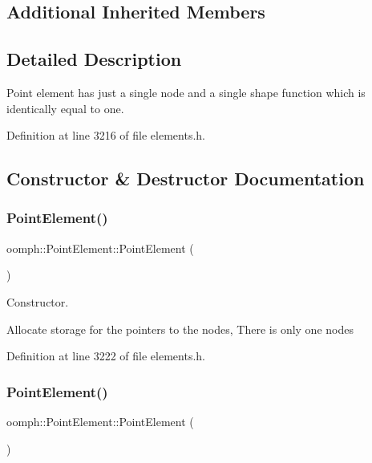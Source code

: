 \subsection*{Additional Inherited Members}


\subsection{Detailed Description}
Point element has just a single node and a single shape function which is identically equal to one. 

Definition at line 3216 of file elements.\+h.



\subsection{Constructor \& Destructor Documentation}
\mbox{\label{classoomph_1_1PointElement_a08937a79fd45c5efd205a0e7535ef1cf}} 
\subsubsection{\texorpdfstring{Point\+Element()}{PointElement()}\hspace{0.1cm}{\footnotesize\ttfamily [1/2]}}
{\footnotesize\ttfamily oomph\+::\+Point\+Element\+::\+Point\+Element (\begin{DoxyParamCaption}{ }\end{DoxyParamCaption})\hspace{0.3cm}{\ttfamily [inline]}}



Constructor. 

Allocate storage for the pointers to the nodes, There is only one nodes 

Definition at line 3222 of file elements.\+h.

\mbox{\label{classoomph_1_1PointElement_a46f7527a4cc666d050f72cefa4a340d1}} 
\subsubsection{\texorpdfstring{Point\+Element()}{PointElement()}\hspace{0.1cm}{\footnotesize\ttfamily [2/2]}}
{\footnotesize\ttfamily oomph\+::\+Point\+Element\+::\+Point\+Element (\begin{DoxyParamCaption}\item[{const \hyperlink{classoomph_1_1PointElement}{Point\+Element} \&}]{ }\end{DoxyParamCaption})\hspace{0.3cm}{\ttfamily [inline]}}



